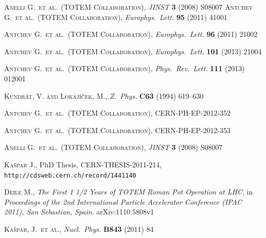 \documentclass[TOTEM]{cern/cernphprep}
\def\etal{et al.}
\def\Name#1{\textsc{#1}, }
\def\REVIEW#1#2#3#4{{\it #1} {\bf #2} (#3) #4}
\begin{document}
\begin{thebibliography}{99}

	\Name{Anelli G.~\etal{}~(TOTEM Collaboration)}
	\REVIEW{JINST}{3}{2008}{S08007}
	\Name{Antchev G.~\etal{}~(TOTEM Collaboration)}
	\REVIEW{Europhys.~Lett.}{95}{2011}{41001}

	\Name{Antchev G.~\etal{}~(TOTEM Collaboration)}
	\REVIEW{Europhys.~Lett.}{96}{2011}{21002}

	\Name{Antchev G.~\etal{}~(TOTEM Collaboration)}
	\REVIEW{Europhys.~Lett.}{101}{2013}{21004}

	\Name{Antchev G.~\etal{}~(TOTEM Collaboration)}
	\REVIEW{Phys.~Rev.~Lett.}{111}{2013}{012001}

	\Name{Kundr\' at, V. and Lokaj\' i\v cek, M.}
	\REVIEW{Z.~Phys.}{C63}{1994}{619--630}


\iffalse
{} 
	\Name{Antchev G.~\etal{}~(TOTEM Collaboration)}
	CERN-PH-EP-2012-352

	\Name{Antchev G.~\etal{}~(TOTEM Collaboration)}
	CERN-PH-EP-2012-353

	\Name{Anelli G.~\etal{}~(TOTEM Collaboration)}
	\REVIEW{JINST}{3}{2008}{S08007}

	\Name{Ka\v spar J.}
	PhD Thesis, CERN-THESIS-2011-214, {\tt http://cdsweb.cern.ch/record/1441140}

	\Name{Deile M.}
	{\it The First 1 1/2 Years of TOTEM Roman Pot Operation at LHC}, in
	{\it Proceedings of the 2nd International Particle Accelerator Conference (IPAC 2011), San Sebastian, Spain}. 
	arXiv:1110.5808v1

	\Name{Ka\v spar, J.~\etal}
	\REVIEW{Nucl.~Phys.}{B843}{2011}{84}


\end{thebibliography}
\end{document}

